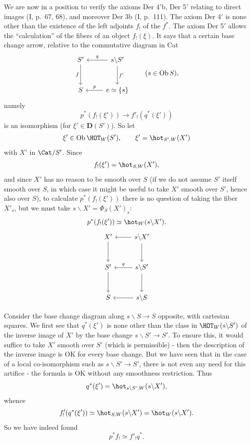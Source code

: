 We are now in a position to verify the axioms Der 4$'$b, Der 5$'$ relating to direct images (I, p.~67, 68), and moreover Der 3b (I, p.~111). The axiom Der 4$'$ is none other than the existence of the left adjoints $f_!$ of the $f^*$. The axiom Der 5$'$ allows the ``calculation'' of the fibers of an object $f_!(\xi)$. It says that a certain
base change arrow, relative to the commutative diagram in Cat
\[\begin{tikzcd}[row sep=large]
S' \arrow[d,"f"'] & s\backslash S' \arrow[l,"q"'] \arrow[d,"f'"] \\
S & e\simeq\{s\} \arrow[l,"p"']
\end{tikzcd}\qquad(s\in\mathrm{Ob}\,S),\]
namely
\[p^*(f_!(\xi'))\longrightarrow f'_!(q^*(\xi'))\]
is an isomorphism (for $\xi'\in\mathbf{D}(S')$). So let
\[\xi'\in\mathrm{Ob}\,\HOT_W(S'),\qquad\xi'=\hot_{S',W}(X')\]
with $X'$ in $\Cat/S'$. Since
\[f_!(\xi')=\hot_{S,W}(X'),\]
and since $X'$ has no reason to be smooth over $S$ (if we do not assume $S'$ itself smooth over $S$, in which case it might be useful to take $X'$ smooth over $S'$, hence also over $S$), to calculate $p^*(f_!(\xi'))$ there is no question of taking the fiber $X'_s$, but we must take $s\backslash X'=\Phi_S(X')_s$:
\[p^*(f_!(\xi'))\simeq\hot_W(s\backslash X').\]
\[\begin{tikzcd}[row sep=large]
X' \arrow[d] & s\backslash X' \arrow[l] \arrow[d] \\
S' \arrow[d] & s\backslash S' \arrow[l,"q"'] \arrow[d] \\
S & s\backslash S \arrow[l]
\end{tikzcd}\]

Consider the base change diagram along $s\backslash S\longrightarrow S$ opposite, with cartesian squares. We first see that $q^*(\xi')$ is none other than the class in $\HOT_W(s\backslash S')$ of the inverse image of $X'$ by the base change $s\backslash S'\longrightarrow S'$. To ensure this, it would suffice to take $X'$ smooth over $S'$ (which
is permissible) - then the description of the inverse image is OK for every base change. But we have seen that in the case of a local co-isomorphism such as $s\backslash S'\longrightarrow S'$, there is not even any need for this artifice - the formula is OK without any smoothness restriction. Thus
\[q^*(\xi')=\hot_{s\backslash S',W}(s\backslash X'),\]
whence
\[f'_!(q^*(\xi'))\simeq\hot_{S,W}(s\backslash X')=\hot_W(s\backslash X').\]
So we have indeed found
\[p^*f_!\simeq f'_!q^*.\]

